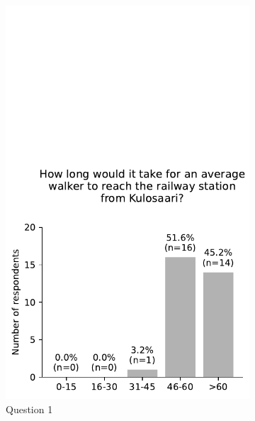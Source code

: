 \begin{figure}[H]
	\centering
	\begin{subfigure}[b]{0.5\textwidth}
		\centering
		\includegraphics[width=\textwidth]{visual/figures/survey/0.pdf}
		\caption{Question 1}
		\label{fig:q 1}
	\end{subfigure}%
	\hfill
	\begin{subfigure}[b]{0.5\textwidth}
		\centering

\end{subfigure}
\end{figure}
